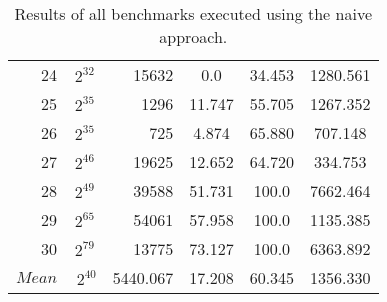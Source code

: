 \begin{table}[b!]
\begin{tabular}{rSrSSS}
    24 & {$2^{32}$} & 15632 & 0.0 & 34.453 & 1280.561  \\
    25 & {$2^{35}$} & 1296 & 11.747 & 55.705 & 1267.352 \\
    26 & {$2^{35}$} & 725 & 4.874 & 65.880 & 707.148 \\
    27 & {$2^{46}$} & 19625 & 12.652 & 64.720 & 334.753 \\
    28 & {$2^{49}$} & 39588 & 51.731 & 100.0 & 7662.464 \\
    29 & {$2^{65}$} & 54061 & 57.958 & 100.0 & 1135.385 \\
    30 & {$2^{79}$} & 13775 & 73.127 & 100.0 & 6363.892 \\	\midrule
	{$Mean$} & {$~2^{40}$} & 5440.067 & 17.208 & 60.345 & 1356.330 \\	\bottomrule
\end{tabular}
\caption{Results of all benchmarks executed using the naive approach.}
\label{tab:resultsnaive}
\end{table}


